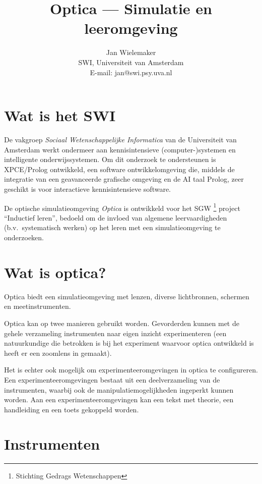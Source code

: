 \documentclass[11pt,twocolumn]{article}
\begin{document}
\title{\vskip -1.2in
       Optica --- Simulatie en leeromgeving}
\author{Jan Wielemaker \\
        SWI, Universiteit van Amsterdam \\
        E-mail: jan@swi.psy.uva.nl}

\maketitle

\section*{Wat is het SWI}

De vakgroep {\em Sociaal Wetenschappelijke Informatica} van de
Universiteit van Amsterdam werkt ondermeer aan kennisintensieve
(computer-)systemen en intelligente onderwijssystemen. Om dit onderzoek
te ondersteunen is XPCE/Prolog ontwikkeld, een software
ontwikkelomgeving die, middels de integratie van een geavanceerde
grafische omgeving en de AI taal Prolog, zeer geschikt is voor
interactieve kennisintensieve software.

De optische simulatieomgeving {\em Optica} is ontwikkeld voor het SGW%
	\footnote{Stichting Gedrags Wetenschappen}
project ``Inductief leren'', bedoeld om de invloed van algemene
leervaardigheden (b.v.\ systematisch werken) op het leren met een
simulatieomgeving te onderzoeken.


\section*{Wat is optica?}

Optica biedt een simulatieomgeving met lenzen, diverse lichtbronnen,
schermen en meetinstrumenten. 

Optica kan op twee manieren gebruikt worden. Gevorderden kunnen met de
gehele verzameling instrumenten naar eigen inzicht experimenteren (een
natuurkundige die betrokken is bij het experiment waarvoor optica
ontwikkeld is heeft er een zoomlens in gemaakt).

Het is echter ook mogelijk om experimenteeromgevingen in optica te
configureren. Een experimenteeromgevingen bestaat uit een
deelverzameling van de instrumenten, waarbij ook de
manipulatiemogelijkheden ingeperkt kunnen worden. Aan een
experimenteeromgevingen kan een tekst met theorie, een handleiding en
een toets gekoppeld worden.


\section*{Instrumenten}
\end{document}
